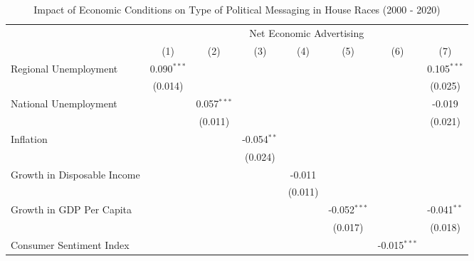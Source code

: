 
\begin{table}[htbp]
   \caption{Impact of Economic Conditions on Type of Political Messaging in House Races (2000 - 2020)}
   \bigskip
   \centering
   \small
   \begin{tabular}{lccccccc}
      \toprule
       & \multicolumn{7}{c}{Net Economic Advertising}\\
                                     & (1)           & (2)           & (3)           & (4)           & (5)            & (6)            & (7)\\  
      \midrule 
      Regional Unemployment          & 0.090$^{***}$ &               &               &               &                &                & 0.105$^{***}$\\   
                                     & (0.014)       &               &               &               &                &                & (0.025)\\   
      National Unemployment          &               & 0.057$^{***}$ &               &               &                &                & -0.019\\   
                                     &               & (0.011)       &               &               &                &                & (0.021)\\   
      Inflation                      &               &               & -0.054$^{**}$ &               &                &                &   \\   
                                     &               &               & (0.024)       &               &                &                &   \\   
      Growth in Disposable Income    &               &               &               & -0.011        &                &                &   \\   
                                     &               &               &               & (0.011)       &                &                &   \\   
      Growth in GDP Per Capita       &               &               &               &               & -0.052$^{***}$ &                & -0.041$^{**}$\\   
                                     &               &               &               &               & (0.017)        &                & (0.018)\\   
      Consumer Sentiment Index       &               &               &               &               &                & -0.015$^{***}$ &   \\   

\end{tabular}
\end{table}
